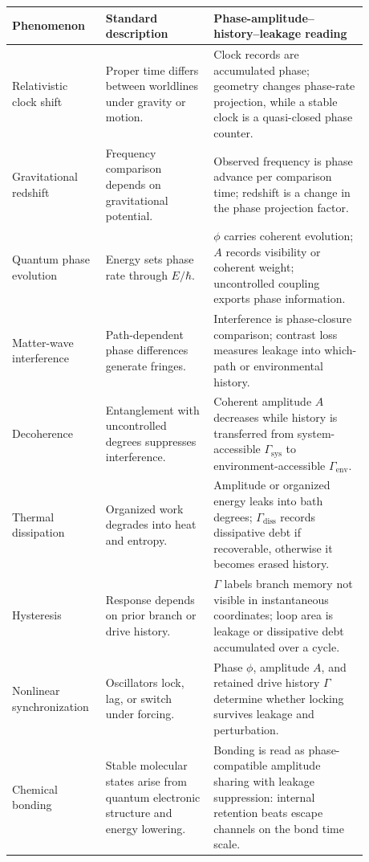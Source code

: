 \documentclass[11pt,a4paper]{article}
\newcommand{\Ghist}{\Gamma}
\begin{document}
\begin{center}
\small
\begin{tabular}{L{0.19\linewidth}L{0.29\linewidth}L{0.40\linewidth}}
\toprule
Phenomenon & Standard description & Phase-amplitude--history--leakage reading \\
\midrule
Relativistic clock shift & Proper time differs between worldlines under gravity or motion. & Clock records are accumulated phase; geometry changes phase-rate projection, while a stable clock is a quasi-closed phase counter. \\
Gravitational redshift & Frequency comparison depends on gravitational potential. & Observed frequency is phase advance per comparison time; redshift is a change in the phase projection factor. \\
Quantum phase evolution & Energy sets phase rate through \(E/\hbar\). & \(\phi\) carries coherent evolution; \(A\) records visibility or coherent weight; uncontrolled coupling exports phase information. \\
Matter-wave interference & Path-dependent phase differences generate fringes. & Interference is phase-closure comparison; contrast loss measures leakage into which-path or environmental history. \\
Decoherence & Entanglement with uncontrolled degrees suppresses interference. & Coherent amplitude \(A\) decreases while history is transferred from system-accessible \(\Ghist_{\mathrm{sys}}\) to environment-accessible \(\Ghist_{\mathrm{env}}\). \\
Thermal dissipation & Organized work degrades into heat and entropy. & Amplitude or organized energy leaks into bath degrees; \(\Ghist_{\mathrm{diss}}\) records dissipative debt if recoverable, otherwise it becomes erased history. \\
Hysteresis & Response depends on prior branch or drive history. & \(\Ghist\) labels branch memory not visible in instantaneous coordinates; loop area is leakage or dissipative debt accumulated over a cycle. \\
Nonlinear synchronization & Oscillators lock, lag, or switch under forcing. & Phase \(\phi\), amplitude \(A\), and retained drive history \(\Ghist\) determine whether locking survives leakage and perturbation. \\
Chemical bonding & Stable molecular states arise from quantum electronic structure and energy lowering. & Bonding is read as phase-compatible amplitude sharing with leakage suppression: internal retention beats escape channels on the bond time scale. \\

\end{tabular}
\end{center}
\end{document}
